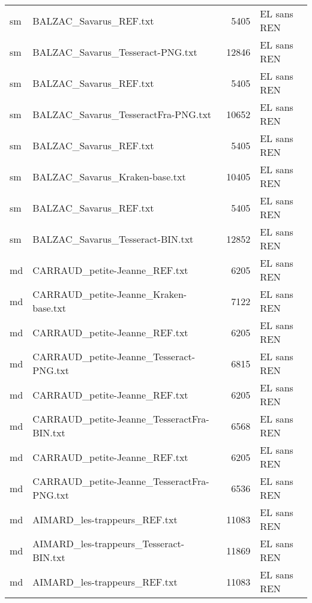 \begin{tabular}{llrl}
    sm &                             BALZAC\_Savarus\_REF.txt &                  5405 & EL sans REN \\
    sm &                   BALZAC\_Savarus\_Tesseract-PNG.txt &                 12846 & EL sans REN \\
    sm &                             BALZAC\_Savarus\_REF.txt &                  5405 & EL sans REN \\
    sm &                BALZAC\_Savarus\_TesseractFra-PNG.txt &                 10652 & EL sans REN \\
    sm &                             BALZAC\_Savarus\_REF.txt &                  5405 & EL sans REN \\
    sm &                     BALZAC\_Savarus\_Kraken-base.txt &                 10405 & EL sans REN \\
    sm &                             BALZAC\_Savarus\_REF.txt &                  5405 & EL sans REN \\
    sm &                   BALZAC\_Savarus\_Tesseract-BIN.txt &                 12852 & EL sans REN \\
    md &                      CARRAUD\_petite-Jeanne\_REF.txt &                  6205 & EL sans REN \\
    md &              CARRAUD\_petite-Jeanne\_Kraken-base.txt &                  7122 & EL sans REN \\
    md &                      CARRAUD\_petite-Jeanne\_REF.txt &                  6205 & EL sans REN \\
    md &            CARRAUD\_petite-Jeanne\_Tesseract-PNG.txt &                  6815 & EL sans REN \\
    md &                      CARRAUD\_petite-Jeanne\_REF.txt &                  6205 & EL sans REN \\
    md &         CARRAUD\_petite-Jeanne\_TesseractFra-BIN.txt &                  6568 & EL sans REN \\
    md &                      CARRAUD\_petite-Jeanne\_REF.txt &                  6205 & EL sans REN \\
    md &         CARRAUD\_petite-Jeanne\_TesseractFra-PNG.txt &                  6536 & EL sans REN \\
    md &                       AIMARD\_les-trappeurs\_REF.txt &                 11083 & EL sans REN \\
    md &             AIMARD\_les-trappeurs\_Tesseract-BIN.txt &                 11869 & EL sans REN \\
    md &                       AIMARD\_les-trappeurs\_REF.txt &                 11083 & EL sans REN \\

\end{tabular}
